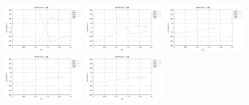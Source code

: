 \noindent
\includegraphics[width=3.5cm]{python_codes/fieldstone_152/RESULTS/exp1/qqq_16_m2}
\includegraphics[width=3.5cm]{python_codes/fieldstone_152/RESULTS/exp1/qqq_16_m3}
\includegraphics[width=3.5cm]{python_codes/fieldstone_152/RESULTS/exp1/qqq_16_m4}
\includegraphics[width=3.5cm]{python_codes/fieldstone_152/RESULTS/exp1/qqq_16_m5}
\includegraphics[width=3.5cm]{python_codes/fieldstone_152/RESULTS/exp1/qqq_16_m6}


